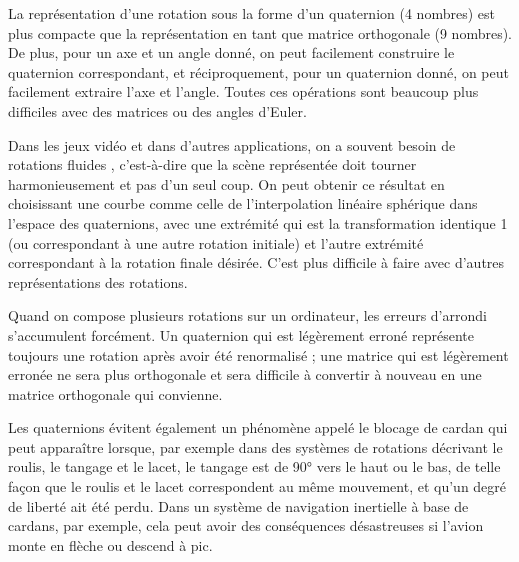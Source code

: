 La représentation d'une rotation sous la forme d'un quaternion (4 nombres) est plus compacte que la représentation en tant que matrice orthogonale (9 nombres). De plus, pour un axe et un angle donné, on peut facilement construire le quaternion correspondant, et réciproquement, pour un quaternion donné, on peut facilement extraire l'axe et l'angle. Toutes ces opérations sont beaucoup plus difficiles avec des matrices ou des angles d'Euler.

Dans les jeux vidéo et dans d'autres applications, on a souvent besoin de \og rotations fluides \fg{}, c'est-à-dire que la scène représentée doit tourner harmonieusement et pas d'un seul coup. On peut obtenir ce résultat en choisissant une courbe comme celle de l'interpolation linéaire sphérique dans l'espace des quaternions, avec une extrémité qui est la transformation identique 1 (ou correspondant à une autre rotation initiale) et l'autre extrémité correspondant à la rotation finale désirée. C'est plus difficile à faire avec d'autres représentations des rotations.

Quand on compose plusieurs rotations sur un ordinateur, les erreurs d'arrondi s'accumulent forcément. Un quaternion qui est légèrement erroné représente toujours une rotation après avoir été renormalisé ; une matrice qui est légèrement erronée ne sera plus orthogonale et sera difficile à convertir à nouveau en une matrice orthogonale qui convienne.

Les quaternions évitent également un phénomène appelé le blocage de cardan qui peut apparaître lorsque, par exemple dans des systèmes de rotations décrivant le roulis, le tangage et le lacet, le tangage est de \ang{90} vers le haut ou le bas, de telle façon que le roulis et le lacet correspondent au même mouvement, et qu'un degré de liberté ait été perdu. Dans un système de navigation inertielle à base de cardans, par exemple, cela peut avoir des conséquences désastreuses si l'avion monte en flèche ou descend à pic.